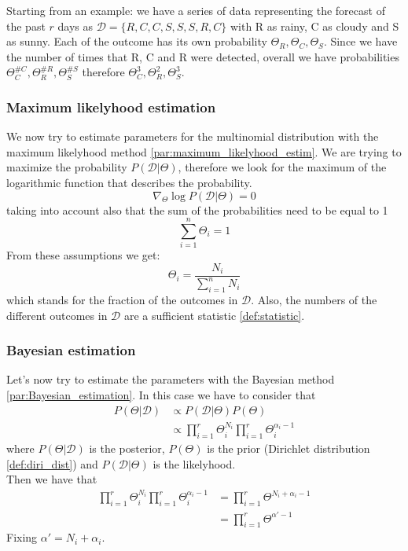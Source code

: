         Starting from an example: we have a series of data representing the forecast of the past $r$ days as $\mathcal{D} = \{R, C, C, S, S, S, R, C\}$ with R as rainy, C as cloudy and S as sunny.
        Each of the outcome has its own probability $\Theta_R, \Theta_C, \Theta_S$. Since we have the number of times that R, C and R were detected, overall we have probabilities $\Theta_C^{\#C}, \Theta_R^{\#R}, \Theta_S^{\#S}$ therefore $\Theta_C^{3}, \Theta_R^{2}, \Theta_S^{3}$.
        
        \subsubsection{Maximum likelyhood estimation}
            We now try to estimate parameters for the multinomial distribution with the maximum likelyhood method \ref{par:maximum_likelyhood_estim}. We are trying to maximize the probability $P(\mathcal{D}|\Theta)$, therefore we look for the maximum of the logarithmic function that describes the probability.
            $$\nabla_\Theta \log P(\mathcal{D}|\Theta) = 0$$
            taking into account also that the sum of the probabilities need to be equal to 1
            $$\sum_{i=1}^n \Theta_i = 1$$
            From these assumptions we get:
            $$\Theta_i = \frac{N_i}{\sum_{i=1}^n N_i}$$
            which stands for the fraction of the outcomes in $\mathcal{D}$. Also, the numbers of the different outcomes in $\mathcal{D}$ are a sufficient statistic \ref{def:statistic}.
            
        \subsubsection{Bayesian estimation}
            Let's now try to estimate the parameters with the Bayesian method \ref{par:Bayesian_estimation}. In this case we have to consider that
            \begin{align*}
                P(\Theta|\mathcal{D}) &\propto P(\mathcal{D}|\Theta)P(\Theta)\\
                &\propto \prod_{i=1}^r \Theta_i^{N_i} \prod_{i=1}^r \Theta_i^{\alpha_i -1}
            \end{align*}
            where $ P(\Theta|\mathcal{D})$ is the posterior, $P(\Theta)$ is the prior (Dirichlet distribution \ref{def:diri_dist}) and $P(\mathcal{D}|\Theta)$ is the likelyhood.\\
            Then we have that
            \begin{align*}
                \prod_{i=1}^r \Theta_i^{N_i} \prod_{i=1}^r \Theta_i^{\alpha_i -1} &= \prod_{i=1}^r \Theta^{N_i + \alpha_i -1}\\
                &= \prod_{i=1}^r \Theta^{\alpha' -1}
            \end{align*}
            Fixing $\alpha' = N_i + \alpha_i$.\\
            
